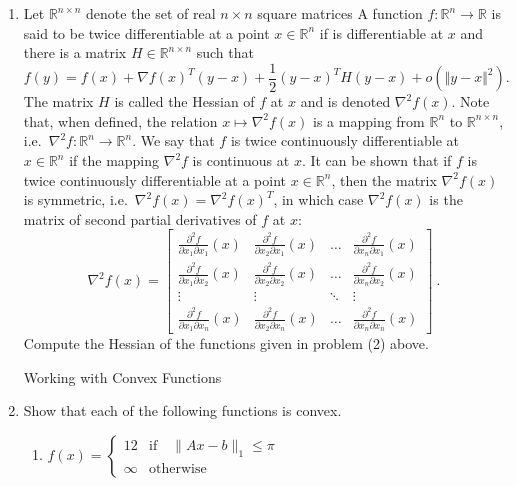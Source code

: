 \documentclass[12pt]{amsart}
\newcommand{\norm}[1]{\Vert #1 \Vert}
\newcommand{\Rn}{\R^n}
\newcommand{\R}{{\mathbb{R}}}
\newcommand{\grad}{\nabla}
\newcommand{\Rnn}{\R^{n\times n}}
\newcommand{\map}[3]{#1:#2\rightarrow #3}
\newcommand{\half}{\frac{1}{2}}
\begin{document}
\begin{enumerate}



\item
Let $\Rnn$ denote the set of real $n\times n$ square matrices
A function $\map{f}{\Rn}{\R}$ is said to be twice differentiable at a point $x\in\Rn$
if is differentiable at $x$ and there is a matrix $H\in\Rnn$ such that
$$f(y)=f(x)+\grad f(x)^T(y-x)+\half (y-x)^TH(y-x)+ o(\norm{y-x}^2).$$
The matrix $H$ is called the Hessian of $f$ at $x$ and is denoted $\grad^2f(x)$.
Note that, when defined, the relation $x\mapsto \grad^2 f(x)$ is
a mapping from $\Rn$ to $\Rnn$, i.e.~$\map{\grad^2 f}{\Rn}{\Rn}$.
We say that $f$ is twice continuously differentiable at $x\in\Rn$ if the mapping
$\grad^2 f$ is continuous at $x$. It can be shown that if $f$ is twice
continuously differentiable at a point $x\in\Rn$, then the matrix
$\grad^2f(x)$ is symmetric, i.e.~$\grad^2f(x)=\grad^2f(x)^T$, in which case
$\grad^2 f(x)$ is the matrix of second partial derivatives of $f$ at $x$:
$$
\grad^2f(x)=\left[\begin{array}{cccc}
\frac{\partial^2 f}{\partial x_1\partial x_1}(x)&
\frac{\partial^2 f}{\partial x_2\partial x_1}(x)&\dots&
\frac{\partial^2 f}{\partial x_n\partial x_1}(x)\\
\frac{\partial^2 f}{\partial x_1\partial x_2}(x)&
\frac{\partial^2 f}{\partial x_2\partial x_2}(x)&\dots&
\frac{\partial^2 f}{\partial x_n\partial x_2}(x)\\
\vdots&\vdots&\ddots&\vdots\\
\frac{\partial^2 f}{\partial x_1\partial x_n}(x)&
\frac{\partial^2 f}{\partial x_2\partial x_n}(x)&\dots&
\frac{\partial^2 f}{\partial x_n\partial x_n}(x)
\end{array}\right]\ .
$$
Compute the Hessian of the functions given in problem (2) above.

\newpage

\noindent
{\sf Working with Convex Functions}

\item
Show that each of the following functions is convex.
\begin{enumerate}
\item $f(x) = \begin{cases} 12 &\text{if}  \quad \|Ax - b\|_1 \leq \pi \\ \infty & \text{otherwise}\end{cases}$


\end{enumerate}
\end{enumerate}
\end{document}
